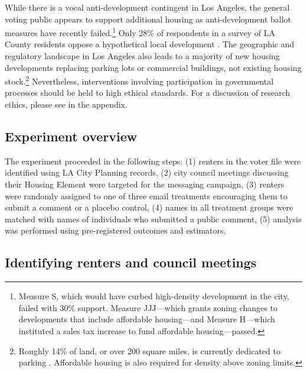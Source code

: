 \documentclass[12pt,final,fleqn]{article}
\theoremstyle{plain}
\begin{document}
While there is a vocal anti-development contingent in Los Angeles, the general voting public appears to support additional housing as anti-development ballot measures have recently failed.\footnote{Measure S, which would have curbed high-density development in the city, failed with 30\% support. Measure JJJ---which grants zoning changes to developments that include affordable housing---and Measure H---which instituted a sales tax increase to fund affordable housing---passed.} Only 28\% of respondents in a survey of LA County residents oppose a hypothetical local development \citep{monkkonen2019opposition}.  The geographic and regulatory landscape in Los Angeles also leads to a majority of new housing developments replacing parking lots or commercial buildings, not existing housing stock.\footnote{Roughly 14\% of land, or over 200 square miles, is currently dedicated to parking \citep{chester2015parking}. Affordable housing is also required for density above zoning limits.} Nevertheless, interventions involving participation in governmental processes should be held to high ethical standards. For a discussion of research ethics, please see  in the appendix. 


\subsection{Experiment overview}

The experiment proceeded in the following steps: (1) renters in the voter file were identified using LA City Planning records, (2) city council meetings discussing their Housing Element were targeted for the messaging campaign, (3) renters were randomly assigned to one of three email treatments encouraging them to submit a comment or a placebo control, (4) names in all treatment groups were matched with names of individuals who submitted a public comment, (5) analysis was performed using pre-registered outcomes and estimators. 


\subsection{Identifying renters and council meetings}
\end{document}
